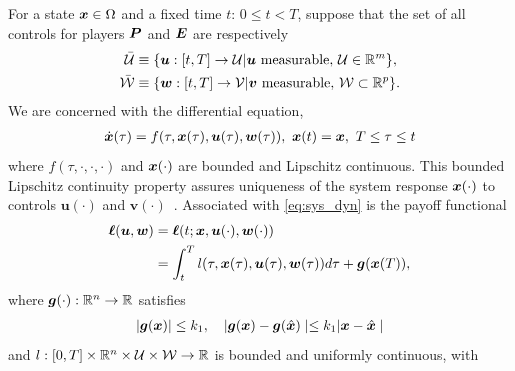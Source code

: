 
For a state $\bm{x} \in \Omega$ and a fixed time $t$: $0 \le t < T$, suppose that the set of all controls for players $\bm{P}$ and $\bm{E}$ are respectively
%
\begin{align}
	\mathcal{\bar{U}} &\equiv \{\bm{u}: [t, T] \rightarrow \mathcal{U} | \bm{u} \text{ measurable}, \, \mathcal{U} \in \mathbb{R}^m \}, \\
	\mathcal{\bar{W}} &\equiv \{\bm{w}: [t, T] \rightarrow \mathcal{V} | \bm{v} \text{ measurable},  \,\mathcal{W} \subset \mathbb{R}^p\}.
\end{align}
%
\noindent We are concerned with the  differential equation,
%
\begin{subequations}
	\begin{align}
		\dot{\bm{x}}(\tau) = f(\tau, \bm{x}(\tau), \bm{u}(\tau), \bm{w}(\tau)), \,\,
		\bm{x}(t) = \bm{x},  \,\, T \le \tau \le t
	\end{align}
	\label{eq:sys_dyn}
\end{subequations}
%
\noindent where $f(\tau, \cdot, \cdot, \cdot)$ and $\bm{x}(\cdot)$ are bounded and Lipschitz continuous. This bounded Lipschitz continuity property assures uniqueness of the system response $\bm{x}(\cdot)$ to controls $\bm{u}(\cdot)$ and $\bm{v}(\cdot)$~\citet{Souganidis}. %
%
Associated with \eqref{eq:sys_dyn} is the payoff functional %
%
\begin{align}
	\bm{\ell}(\bm{u}, \bm{w}) &=	\bm{\ell}(t; \bm{x}, \bm{u}(\cdot), \bm{w}(\cdot)) \nonumber \\
	&= \int_{t}^{T} l(\tau, \bm{x}(\tau), \bm{u}(\tau), \bm{w}(\tau)) d\tau + \bm{g}(\bm{x}(T)),
	\label{eq:payoff}
\end{align}
%
where $\bm{g}(\cdot): \mathbb{R}^n \rightarrow \mathbb{R}$ %
satisfies
%
	\begin{align}
		| \bm{g}(\bm{x}) | \le k_1, \quad 
		| \bm{g}(\bm{x}) - \bm{g}(\hat{\bm{x}}) \mid \le k_1 | \bm{x} - \hat{\bm{x}} \mid
	\end{align}
%
and $l:[0, T] \times  \mathbb{R}^n \times \mathcal{U} \times \mathcal{W} \rightarrow \mathbb{R}$ is bounded and uniformly continuous, with
